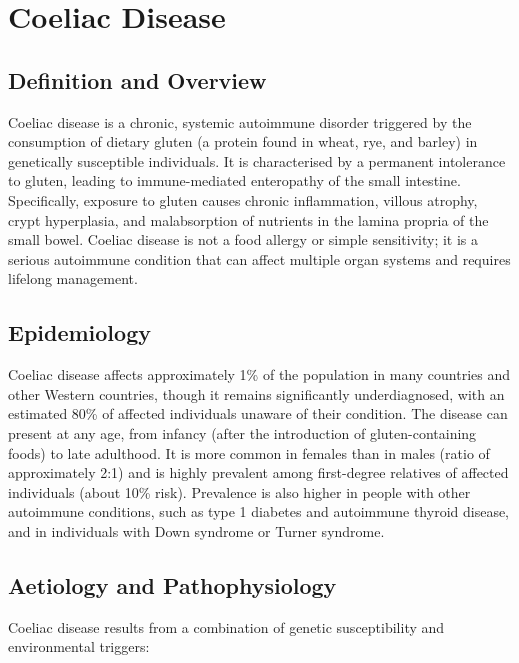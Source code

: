 \chapter{Coeliac Disease}

\section*{Definition and Overview}
Coeliac disease is a chronic, systemic autoimmune disorder triggered by the consumption of dietary gluten (a protein found in wheat, rye, and barley) in genetically susceptible individuals. It is characterised by a permanent intolerance to gluten, leading to immune-mediated enteropathy of the small intestine. Specifically, exposure to gluten causes chronic inflammation, villous atrophy, crypt hyperplasia, and malabsorption of nutrients in the lamina propria of the small bowel. Coeliac disease is not a food allergy or simple sensitivity; it is a serious autoimmune condition that can affect multiple organ systems and requires lifelong management.

\section*{Epidemiology}
Coeliac disease affects approximately 1\% of the population in many countries and other Western countries, though it remains significantly underdiagnosed, with an estimated 80\% of affected individuals unaware of their condition. The disease can present at any age, from infancy (after the introduction of gluten-containing foods) to late adulthood. It is more common in females than in males (ratio of approximately 2:1) and is highly prevalent among first-degree relatives of affected individuals (about 10\% risk). Prevalence is also higher in people with other autoimmune conditions, such as type 1 diabetes and autoimmune thyroid disease, and in individuals with Down syndrome or Turner syndrome.

\section*{Aetiology and Pathophysiology}
Coeliac disease results from a combination of genetic susceptibility and environmental triggers:

